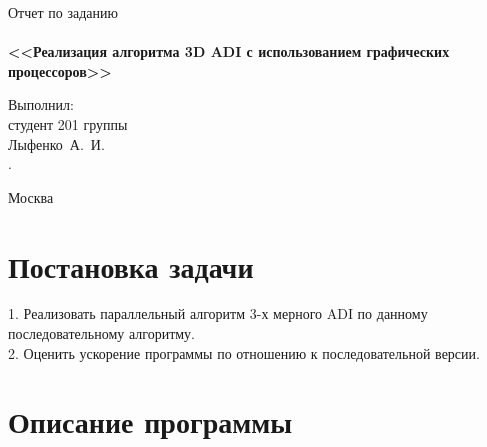 \documentclass[a4paper,12pt,titlepage,draft]{article}
\begin{document}
\begin{titlepage}
    \begin{center}
	{\Large \sc Отчет по заданию}\\
	~\\
	{\large \bf <<Реализация алгоритма 3D ADI с использованием графических процессоров>>}\\ 
    \end{center}
    \begin{flushright}
	\vfill {Выполнил:\\
	студент 201 группы\\
	Лыфенко~А.~И.\\.}
    \end{flushright}
    \begin{center}
	\vfill
	{\small Москва\\ \the\year{}}
    \end{center}
\end{titlepage}

\section{Постановка задачи}
1. Реализовать параллельный алгоритм 3-х мерного ADI по данному последовательному алгоритму.\\

2. Оценить ускорение программы по отношению к последовательной версии.\\
\newpage
\section{Описание программы}
\newpage
\end{document}
